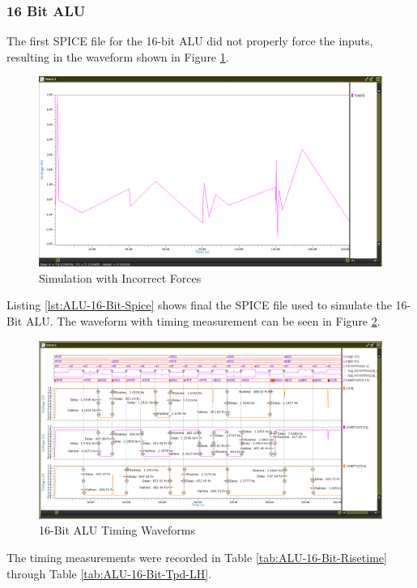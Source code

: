 \documentclass[11pt]{article}
\begin{document}
		\subsubsection{16 Bit ALU}
		
			The first SPICE file for the 16-bit ALU did not properly force the inputs, resulting in the waveform shown in Figure \ref{fig:terrible-simulation}.
		
			\begin{figure}[H]
				\centering
				\includegraphics[width=0.7\linewidth]{"Pictures/Terrible Simulation"}
				\caption{Simulation with Incorrect Forces}
				\label{fig:terrible-simulation}
			\end{figure}
			
			Listing \ref{lst:ALU-16-Bit-Spice} shows final the SPICE file used to simulate the 16-Bit ALU.  The waveform with timing measurement can be seen in Figure \ref{fig:alu-16-bit-full-timing}.
		
			\begin{figure}[H]
				\centering
				\includegraphics[width=1\linewidth]{"Pictures/ALU 16-Bit Full Timing"}
				\caption{16-Bit ALU Timing Waveforms}
				\label{fig:alu-16-bit-full-timing}
			\end{figure}
			
			The timing measurements were recorded in Table \ref{tab:ALU-16-Bit-Risetime} through Table \ref{tab:ALU-16-Bit-Tpd-LH}.
		
\end{document}

